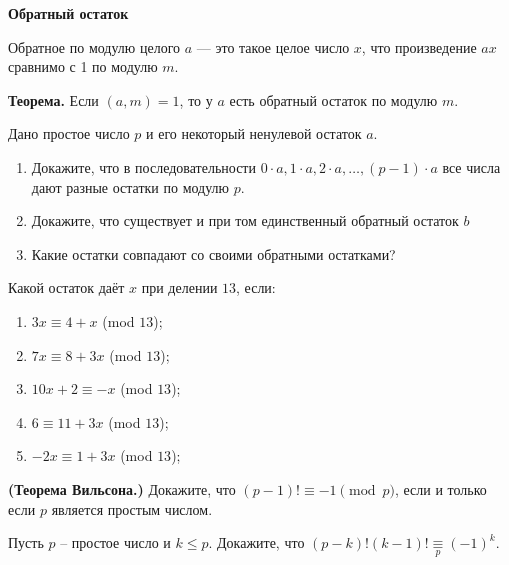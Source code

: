 \documentclass{article}
\begin{document}
    \large

    \begin{center}
        \textbf{Обратный остаток}
    \end{center}

    Обратное по модулю целого $a$ --- это такое целое число $x$, что произведение $ax$ сравнимо с 1 по модулю $m$.

    \textbf{Теорема.} Если $(a,m) = 1$, то у $a$ есть обратный остаток по модулю $m$.


    \begin{enumerate_boxed}

        \item Дано простое число $p$ и его некоторый ненулевой остаток $a$.
        \begin{enumerate}
            \item Докажите, что в последовательности $0 \cdot a, 1 \cdot a, 2 \cdot a, \dots ,(p - 1) \cdot a$ все числа дают разные остатки по модулю $p$.

            \item Докажите, что существует и при том единственный обратный остаток $b$

            \item Какие остатки совпадают со своими обратными остатками?
        \end{enumerate}
        \item Какой остаток даёт $x$ при делении $13$, если:
        \begin{enumerate}
            \item $3x \equiv 4 + x$ (mod $13$);

            \item $7x \equiv 8 + 3x$ (mod $13$);

            \item $10x + 2 \equiv -x$ (mod $13$);

            \item $6 \equiv 11 + 3x$ (mod $13$);

            \item $-2x \equiv 1 + 3x$ (mod $13$);

        \end{enumerate}
        \item \textbf{(Теорема Вильсона.)} Докажите, что $(p-1)!\equiv -1\pmod p$, если и только если $p$ является простым числом.

        \item Пусть $p$ -- простое число и $k \leqslant p$.
        Докажите, что $(p - k)!(k - 1)! \underset{p}{\equiv} (-1)^k$.


\end{enumerate_boxed}
\end{document}
